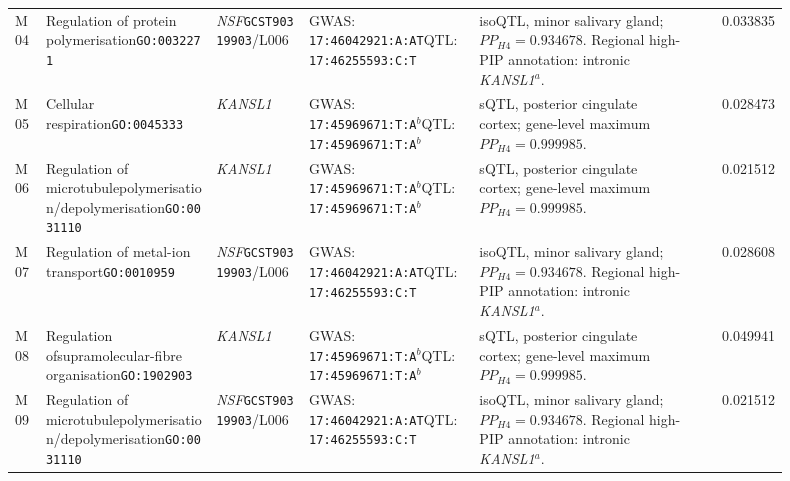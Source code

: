 \documentclass[11pt,a4paper]{article}
\begin{document}
\begin{landscape}
\begin{longtable}{@{}Y{0.040\linewidth}Y{0.225\linewidth}Y{0.125\linewidth}Y{0.225\linewidth}Y{0.280\linewidth}r@{}}
M04 & Regulation of protein polymerisation\newline\texttt{GO:0032271} & \textit{NSF}\newline\texttt{GCST90319903}/L006 & GWAS: \texttt{17:46042921:A:AT}\newline QTL: \texttt{17:46255593:C:T} & isoQTL, minor salivary gland; $PP_{H4}=0.934678$. Regional high-PIP annotation: intronic \textit{KANSL1}$^{a}$. & 0.033835 \\
M05 & Cellular respiration\newline\texttt{GO:0045333} & \textit{KANSL1}\newline & GWAS: \texttt{17:45969671:T:A}$^{b}$\newline QTL: \texttt{17:45969671:T:A}$^{b}$ & sQTL, posterior cingulate cortex; gene-level maximum $PP_{H4}=0.999985$.  & 0.028473 \\
M06 & Regulation of microtubule\newline polymerisation/\allowbreak depolymerisation\newline\texttt{GO:0031110} & \textit{KANSL1}\newline & GWAS: \texttt{17:45969671:T:A}$^{b}$\newline QTL: \texttt{17:45969671:T:A}$^{b}$ & sQTL, posterior cingulate cortex; gene-level maximum $PP_{H4}=0.999985$.  & 0.021512 \\
M07 & Regulation of metal-ion transport\newline\texttt{GO:0010959} & \textit{NSF}\newline\texttt{GCST90319903}/L006 & GWAS: \texttt{17:46042921:A:AT}\newline QTL: \texttt{17:46255593:C:T} & isoQTL, minor salivary gland; $PP_{H4}=0.934678$. Regional high-PIP annotation: intronic \textit{KANSL1}$^{a}$. & 0.028608 \\
M08 & Regulation of\newline supramolecular-fibre organisation\newline\texttt{GO:1902903} & \textit{KANSL1}\newline & GWAS: \texttt{17:45969671:T:A}$^{b}$\newline QTL: \texttt{17:45969671:T:A}$^{b}$ & sQTL, posterior cingulate cortex; gene-level maximum $PP_{H4}=0.999985$.  & 0.049941 \\
M09 & Regulation of microtubule\newline polymerisation/\allowbreak depolymerisation\newline\texttt{GO:0031110} & \textit{NSF}\newline\texttt{GCST90319903}/L006 & GWAS: \texttt{17:46042921:A:AT}\newline QTL: \texttt{17:46255593:C:T} & isoQTL, minor salivary gland; $PP_{H4}=0.934678$. Regional high-PIP annotation: intronic \textit{KANSL1}$^{a}$. & 0.021512 \\

\end{longtable}
\end{landscape}
\end{document}
